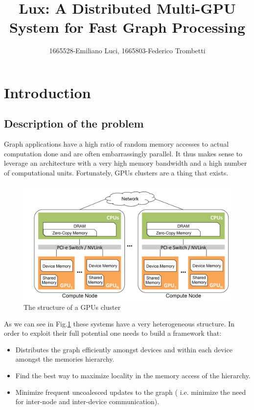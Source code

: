 \documentclass[]{article}
\title{Lux: A Distributed Multi-GPU System for Fast Graph Processing}
\author{1665528-Emiliano Luci, 1665803-Federico Trombetti}
\begin{document}
\maketitle

\section{Introduction}
\subsection{Description of the problem}
Graph applications have a high ratio of random memory accesses to actual computation done and are often embarrassingly parallel. It thus makes sense to leverage an architecture with a very high memory bandwidth and a high number of computational units. Fortunately, GPUs clusters are a thing that exists. 

\begin{figure}[H]

	\centering
	\includegraphics[width=0.7\linewidth]{gpu_cluster.png}
	\caption{The structure of a GPUs cluster}
	\label{fig:gpu_cluster}
\end{figure}
As we can see in Fig.\ref{fig:gpu_cluster} these systems have a very heterogeneous structure. In order to exploit their full potential one needs to build a framework that:
\begin{itemize}
	\item Distributes the graph efficiently amongst devices and within each device amongst the memories hierarchy.
	\item Find the best way to maximize locality in the memory access of the hierarchy.
	\item Minimize frequent uncoalesced updates to the graph ( i.e. minimize the need for inter-node and inter-device communication).
\end{itemize}
\end{document}
